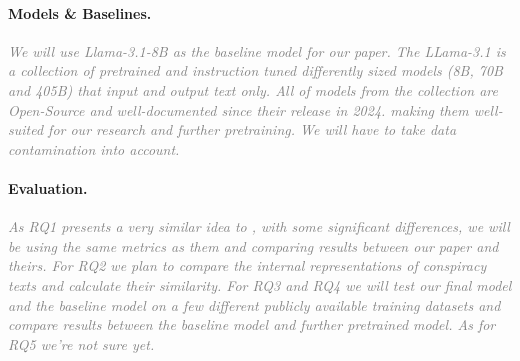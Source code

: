 \documentclass[11pt, a4paper]{article}
\newif\ifinstructions
\newcommand{\explain}[1]{%
  \ifinstructions
    \par\vspace{2pt}%
    {\small\color{exgray} #1}%
    \par\vspace{2pt}%
  \fi
}
\newcommand{\example}[1]{%
  \ifinstructions
    \par\vspace{1pt}%
    {\small\color{exblue} #1}%
    \par\vspace{4pt}%
  \fi
}
\newcommand{\fillhere}[1]{%
  \par\vspace{2pt}%
  \textit{\textcolor{gray}{#1}}%
  \par\vspace{2pt}%
}
\begin{document}
{\paragraph{Models \& Baselines.}
\explain{What systems will you build, fine-tune, or prompt? What baselines will you compare against and why? Justify why these models are appropriate for your RQs.}
\example{``Our primary model is XLM-R\textsubscript{large} \citep{conneau2020xlmr}, chosen for its strong multilingual coverage of Slavic scripts. We compare against mBERT \citep{devlin2019bert} as a weaker multilingual baseline and a language-specific monolingual model as an upper-bound oracle. This setup directly addresses RQ1 by isolating the effect of multilingual pre-training scale.''}
\fillhere{We will use Llama-3.1-8B as the baseline model for our paper. The LLama-3.1 is a collection of pretrained and instruction tuned differently sized models (8B, 70B and 405B) that input and output text only. All of models from the collection are Open-Source and well-documented since their release in 2024. making them well-suited for our research and further pretraining. We will have to take data contamination into account.}

\paragraph{Evaluation.}
\explain{What metrics will you use to measure performance? Why are these metrics appropriate for your RQs? Note any known limitations of these metrics.}
\example{``We report span-level F\textsubscript{1} following the CoNLL evaluation standard, which is the de facto metric for NER and enables direct comparison with prior work. We also report per-language and per-entity-type breakdowns to address RQ2. We note that F\textsubscript{1} does not distinguish between boundary and label errors, which we will supplement with a qualitative error analysis.''}
\fillhere{As RQ1 presents a very similar idea to \citep{fort2023bigfoot}, with some significant differences, we will be using the same metrics as them and comparing results between our paper and theirs. For RQ2 we plan to compare the internal representations of conspiracy texts and calculate their similarity. For RQ3 and RQ4 we will test our final model and the baseline model on a few different publicly available training datasets and compare results between the baseline model and further pretrained model. As for RQ5 we're not sure yet.}

}
\end{document}
